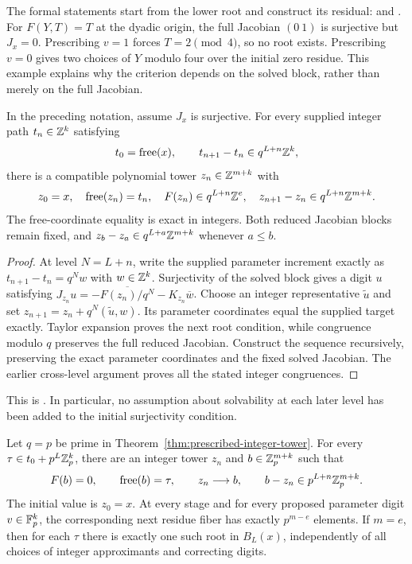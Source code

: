 The formal statements start from the lower root and construct its residual:
and .
For $F(Y,T)=T$ at the dyadic origin, the full Jacobian $(0\ 1)$ is
surjective but $J_x=0$. Prescribing $v=1$ forces $T=2\pmod4$, so no root
exists. Prescribing $v=0$ gives two choices of $Y$ modulo four over the
initial zero residue. This example explains why the criterion depends on
the solved block, rather than merely on the full Jacobian.

\begin{theorem}
\label{thm:prescribed-integer-tower}
In the preceding notation, assume $J_x$ is surjective. For every supplied
integer path $t_n\in\mathbb Z^k$ satisfying
\[
 t_0=\operatorname{free}(x),\qquad
 t_{n+1}-t_n\in q^{L+n}\mathbb Z^k,
\]
there is a compatible polynomial tower $z_n\in\mathbb Z^{m+k}$ with
\[
 z_0=x,\quad \operatorname{free}(z_n)=t_n,\quad
 F(z_n)\in q^{L+n}\mathbb Z^e,\quad
 z_{n+1}-z_n\in q^{L+n}\mathbb Z^{m+k}.
\]
The free-coordinate equality is exact in integers. Both reduced Jacobian
blocks remain fixed, and $z_b-z_a\in q^{L+a}\mathbb Z^{m+k}$ whenever $a\le b$.
\end{theorem}

\begin{proof}
At level $N=L+n$, write the supplied parameter increment exactly as
$t_{n+1}-t_n=q^Nw$ with $w\in\mathbb Z^k$. Surjectivity of the solved block
gives a digit $u$ satisfying
$J_{z_n}u=-\overline{F(z_n)/q^N}-K_{z_n}\overline w$.
Choose an integer representative $\widetilde u$ and set
$z_{n+1}=z_n+q^N(\widetilde u,w)$. Its parameter coordinates equal the
supplied target exactly. Taylor expansion proves the next root condition,
while congruence modulo $q$ preserves the full reduced Jacobian.
Construct the sequence recursively, preserving the exact parameter
coordinates and the fixed solved Jacobian. The earlier cross-level
argument proves all the stated integer congruences.
\end{proof}

This is
.
In particular, no assumption about solvability at each later level has been
added to the initial surjectivity condition.

\begin{theorem}
\label{thm:prescribed-padic-tower}
Let $q=p$ be prime in Theorem~\ref{thm:prescribed-integer-tower}.
For every $\tau\in t_0+p^L\mathbb Z_p^k$, there are an integer tower $z_n$ and
$b\in\mathbb Z_p^{m+k}$ such that
\[
 F(b)=0,\qquad\operatorname{free}(b)=\tau,\qquad
 z_n\longrightarrow b,\qquad b-z_n\in p^{L+n}\mathbb Z_p^{m+k}.
\]
The initial value is $z_0=x$. At every stage and for every proposed
parameter digit $v\in\mathbb F_p^k$, the corresponding next residue fiber has
exactly $p^{m-e}$ elements. If $m=e$, then for each $\tau$ there is exactly
one such root in $B_L(x)$, independently of all choices of integer
approximants and correcting digits.
\end{theorem}

